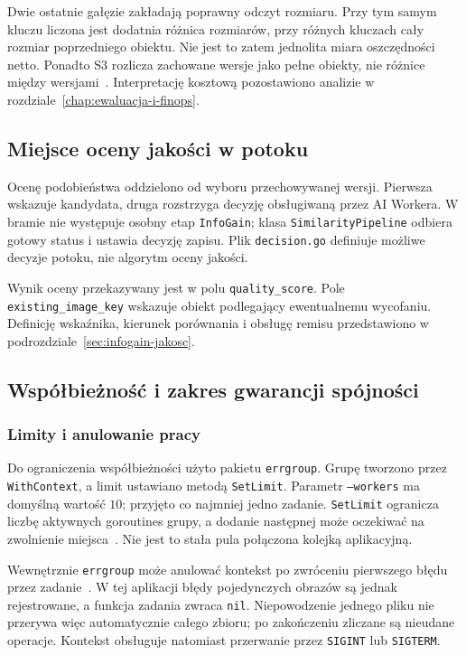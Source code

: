Dwie ostatnie gałęzie zakładają poprawny odczyt rozmiaru.
Przy tym samym kluczu liczona jest dodatnia różnica rozmiarów,
przy różnych kluczach cały rozmiar poprzedniego obiektu.
Nie jest to zatem jednolita miara oszczędności netto.
Ponadto S3 rozlicza zachowane wersje jako pełne obiekty,
nie różnice między wersjami~\cite{aws_s3_versioning_workflows}.
Interpretację kosztową pozostawiono analizie
w rozdziale~\ref{chap:ewaluacja-i-finops}.

\subsection{Miejsce oceny jakości w potoku}
\label{subsec:logika-decyzyjna}

Ocenę podobieństwa oddzielono od wyboru przechowywanej wersji.
Pierwsza wskazuje kandydata, druga rozstrzyga decyzję obsługiwaną
przez AI Workera. W bramie nie występuje osobny etap
\texttt{InfoGain}; klasa \texttt{SimilarityPipeline} odbiera
gotowy status i ustawia decyzję zapisu.
Plik \texttt{decision.go} definiuje możliwe decyzje potoku,
nie algorytm oceny jakości.

Wynik oceny przekazywany jest w polu \texttt{quality\_score}.
Pole \texttt{existing\_image\_key} wskazuje obiekt podlegający
ewentualnemu wycofaniu.
Definicję wskaźnika, kierunek porównania i obsługę remisu przedstawiono
w podrozdziale~\ref{sec:infogain-jakosc}.

\subsection{Współbieżność i zakres gwarancji spójności}
\label{subsec:wspolbieznosc}

\subsubsection{Limity i anulowanie pracy}

Do ograniczenia współbieżności użyto pakietu \texttt{errgroup}.
Grupę tworzono przez \texttt{WithContext}, a limit ustawiano
metodą \texttt{SetLimit}.
Parametr \texttt{--workers} ma domyślną wartość \(10\);
przyjęto co najmniej jedno zadanie.
\texttt{SetLimit} ogranicza liczbę aktywnych goroutines grupy,
a dodanie następnej może oczekiwać na zwolnienie
miejsca~\cite{go_errgroup}.
Nie jest to stała pula połączona kolejką aplikacyjną.

Wewnętrznie \texttt{errgroup} może anulować kontekst po zwróceniu
pierwszego błędu przez zadanie~\cite{go_errgroup}.
W tej aplikacji błędy pojedynczych obrazów są jednak rejestrowane,
a funkcja zadania zwraca \texttt{nil}.
Niepowodzenie jednego pliku nie przerywa więc automatycznie całego
zbioru; po zakończeniu zliczane są nieudane operacje.
Kontekst obsługuje natomiast przerwanie przez \texttt{SIGINT}
lub \texttt{SIGTERM}.

